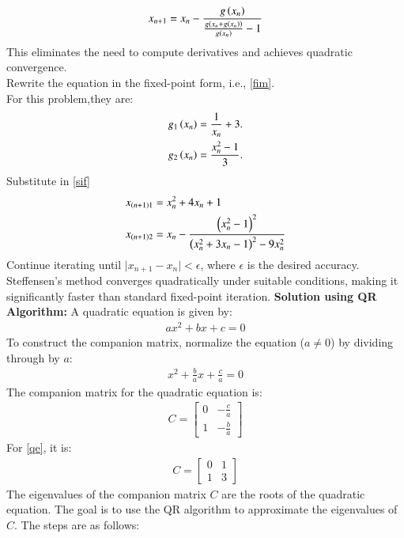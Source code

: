\documentclass[journal,12pt,onecolumn]{IEEEtran}
\theoremstyle{remark}
\begin{document}
\begin{align}
x_{n+1} = x_n - \frac{g\left(x_n\right)}{\frac{g\left(x_n+g\left(x_n\right)\right)}{g\left(x_n\right)}-1} \label{sif}
\end{align}
This eliminates the need to compute derivatives and achieves quadratic convergence.\\Rewrite the equation in the fixed-point form, i.e., \ref{fim}.\\
For this problem,they are:
\begin{align}
g_1\left(x_n\right) &= \frac{1}{x_n} + 3.\\
g_2\left(x_n\right) &= \frac{x_n^2-1}{3}.
\end{align}
Substitute in \ref{sif}
\begin{align}
x_{\left(n+1\right)1}&=x_n^2+4x_n+1\\
x_{\left(n+1\right)2}&=x_n -\frac{\left(x_n^2-1\right)^2}{\left(x_n^2+3x_n-1\right)^2-9x_n^2}
\end{align}
Continue iterating until $ \lvert x_{n+1} - x_n\rvert < \epsilon $, where $ \epsilon $ is the desired accuracy.
Steffensen's method converges quadratically under suitable conditions, making it significantly faster than standard fixed-point iteration.
\textbf{Solution using QR Algorithm:} 
A quadratic equation is given by:
\begin{align}
 ax^2 + bx + c = 0   
\end{align}
To construct the companion matrix, normalize the equation ($a \neq 0$) by dividing through by $a$:
\begin{align}
x^2 + \frac{b}{a}x + \frac{c}{a} = 0
\end{align}
The companion matrix for the quadratic equation is:
\begin{align}
C = \begin{bmatrix}
0 & -\frac{c}{a} \\
1 & -\frac{b}{a}
\end{bmatrix}
\end{align}
For \ref{qe}, it is:
\begin{align}
C = \begin{bmatrix}
0 & 1 \\
1 & 3
\end{bmatrix}
\end{align}
The eigenvalues of the companion matrix $C$ are the roots of the quadratic equation. The goal is to use the QR algorithm to approximate the eigenvalues of $C$. The steps are as follows:
\end{document}
